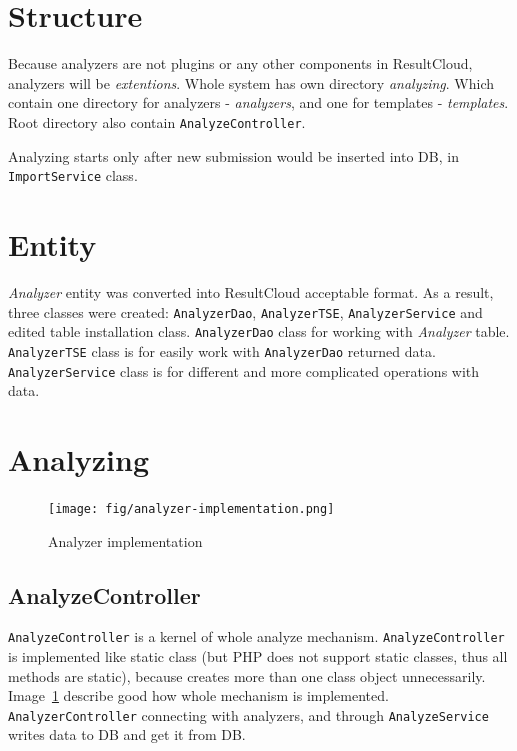 \section{Structure}

Because analyzers are not plugins or any other components in ResultCloud, analyzers will be \emph{extentions}. Whole system has own directory \emph{analyzing}. Which contain one directory for analyzers - \emph{analyzers}, and one for templates - \emph{templates}. Root directory also contain \texttt{AnalyzeController}.

Analyzing starts only after new submission would be inserted into DB, in \texttt{ImportService} class.

\section{Entity}

\emph{Analyzer} entity was converted into ResultCloud acceptable format. As a result, three classes were created: \texttt{AnalyzerDao}, \texttt{AnalyzerTSE}, \texttt{AnalyzerService} and edited table installation class. \texttt{AnalyzerDao} class for working with \emph{Analyzer} table. \texttt{AnalyzerTSE} class is for easily work with \texttt{AnalyzerDao} returned data. \texttt{AnalyzerService} class is for different and more complicated operations with data.

\section{Analyzing}

\begin{figure}
  \centering
    \texttt{[image: fig/analyzer-implementation.png]}
  \caption{Analyzer implementation}
  \label{fig:an_impl}
\end{figure}

\subsection{AnalyzeController}

\texttt{AnalyzeController} is a kernel of whole analyze mechanism. \texttt{AnalyzeController} is implemented like static class (but PHP does not support static classes, thus all methods are static), because creates more than one class object unnecessarily. Image\ \ref{fig:an_impl} describe good how whole mechanism is implemented. \texttt{AnalyzerController} connecting with analyzers, and through \texttt{AnalyzeService} writes data to DB and get it from DB.

